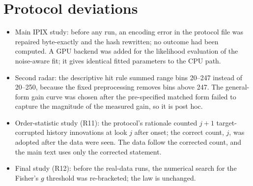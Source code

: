 \documentclass[10pt]{article}
\begin{document}
\section{Protocol deviations}\label{sup:deviations}
\begin{itemize}
\item Main IPIX study: before any run, an encoding error in the protocol file was repaired byte-exactly and the hash rewritten; no outcome had been computed. A GPU backend was added for the likelihood evaluation of the noise-aware fit; it gives identical fitted parameters to the CPU path.
\item Second radar: the descriptive hit rule summed range bins 20--247 instead of 20--250, because the fixed preprocessing removes bins above 247. The general-form gain curve was chosen after the pre-specified matched form failed to capture the magnitude of the measured gain, so it is post hoc.
\item Order-statistic study (R11): the protocol's rationale counted $j+1$ target-corrupted history innovations at look $j$ after onset; the correct count, $j$, was adopted after the data were seen. The data follow the corrected count, and the main text uses only the corrected statement.
\item Final study (R12): before the real-data runs, the numerical search for the Fisher's $g$ threshold was re-bracketed; the law is unchanged.
\end{itemize}
\end{document}
